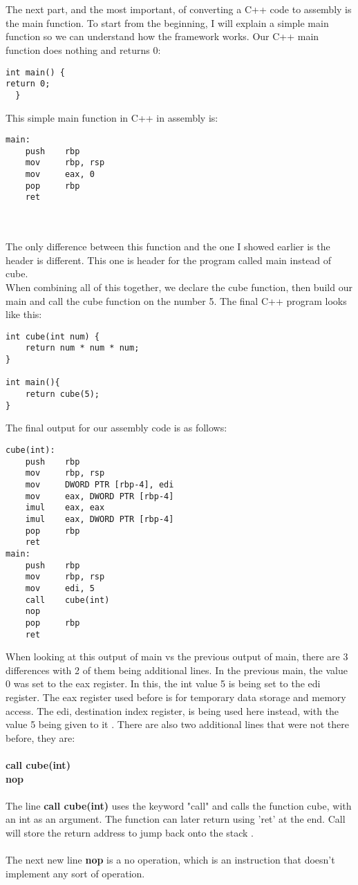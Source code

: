 \documentclass{article}
\theoremstyle{theorem}
\theoremstyle{definition}
\theoremstyle{remark}
\begin{document}
\\
\\
The next part, and the most important, of converting a C++ code to assembly is the main function. To start from the beginning, I will explain a simple main function so we can understand how the framework works. Our C++ main function does nothing and returns 0:
\begin{lstlisting}
int main() {
return 0;
  }
\end{lstlisting}

This simple main function in C++ in assembly is:
\begin{lstlisting}
main:
    push    rbp
    mov     rbp, rsp
    mov     eax, 0
    pop     rbp
    ret
\end{lstlisting} \cite{GODBOLT}
\\
\\
The only difference between this function and the one I showed earlier is the header is different. This one is header for the program called main instead of cube.
\\
When combining all of this together, we declare the cube function, then build our main and call the cube function on the number 5. The final C++ program looks like this:
\begin{lstlisting}
int cube(int num) {
    return num * num * num;
}

int main(){
    return cube(5);
}
\end{lstlisting}

The final output for our assembly code is as follows:
\begin{lstlisting}
cube(int):
    push    rbp
    mov     rbp, rsp
    mov     DWORD PTR [rbp-4], edi
    mov     eax, DWORD PTR [rbp-4]
    imul    eax, eax
    imul    eax, DWORD PTR [rbp-4]
    pop     rbp
    ret
main:
    push    rbp
    mov     rbp, rsp
    mov     edi, 5
    call    cube(int)
    nop
    pop     rbp
    ret
\end{lstlisting}

When looking at this output of main vs the previous output of main, there are 3 differences with 2 of them being additional lines. In the previous main, the value 0 was set to the eax register. In this, the int value 5 is being set to the edi register. The eax register used before is for temporary data storage and memory access. The edi, destination index register, is being used here instead, with the value 5 being given to it \cite{x86}. There are also two additional lines that were not there before, they are:
\\
\\ \textbf{call cube(int)}
\\ \textbf{nop}
\\
\\
The line \textbf{call cube(int)} uses the keyword "call" and calls the function cube, with an int as an argument. The function can later return using 'ret' at the end. Call will store the return address to jump back onto the stack \cite{FASS}.
\\
\\
The next new line \textbf{nop} is a no operation, which is an instruction that doesn't implement any sort of operation.
\end{document}
